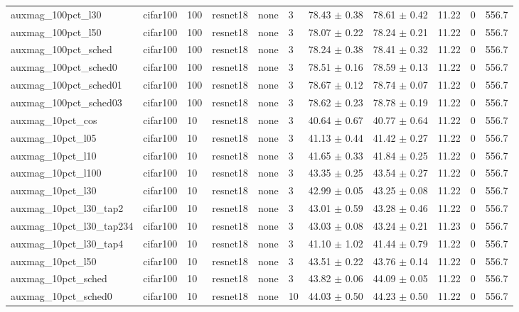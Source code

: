 \begin{tabular}{lllllllllll}
auxmag_100pct_l30 & cifar100 & 100 & resnet18 & none & 3 & 78.43 $\pm$ 0.38 & 78.61 $\pm$ 0.42 & 11.22 & 0 & 556.7 \\
auxmag_100pct_l50 & cifar100 & 100 & resnet18 & none & 3 & 78.07 $\pm$ 0.22 & 78.24 $\pm$ 0.21 & 11.22 & 0 & 556.7 \\
auxmag_100pct_sched & cifar100 & 100 & resnet18 & none & 3 & 78.24 $\pm$ 0.38 & 78.41 $\pm$ 0.32 & 11.22 & 0 & 556.7 \\
auxmag_100pct_sched0 & cifar100 & 100 & resnet18 & none & 3 & 78.51 $\pm$ 0.16 & 78.59 $\pm$ 0.13 & 11.22 & 0 & 556.7 \\
auxmag_100pct_sched01 & cifar100 & 100 & resnet18 & none & 3 & 78.67 $\pm$ 0.12 & 78.74 $\pm$ 0.07 & 11.22 & 0 & 556.7 \\
auxmag_100pct_sched03 & cifar100 & 100 & resnet18 & none & 3 & 78.62 $\pm$ 0.23 & 78.78 $\pm$ 0.19 & 11.22 & 0 & 556.7 \\
auxmag_10pct_cos & cifar100 & 10 & resnet18 & none & 3 & 40.64 $\pm$ 0.67 & 40.77 $\pm$ 0.64 & 11.22 & 0 & 556.7 \\
auxmag_10pct_l05 & cifar100 & 10 & resnet18 & none & 3 & 41.13 $\pm$ 0.44 & 41.42 $\pm$ 0.27 & 11.22 & 0 & 556.7 \\
auxmag_10pct_l10 & cifar100 & 10 & resnet18 & none & 3 & 41.65 $\pm$ 0.33 & 41.84 $\pm$ 0.25 & 11.22 & 0 & 556.7 \\
auxmag_10pct_l100 & cifar100 & 10 & resnet18 & none & 3 & 43.35 $\pm$ 0.25 & 43.54 $\pm$ 0.27 & 11.22 & 0 & 556.7 \\
auxmag_10pct_l30 & cifar100 & 10 & resnet18 & none & 3 & 42.99 $\pm$ 0.05 & 43.25 $\pm$ 0.08 & 11.22 & 0 & 556.7 \\
auxmag_10pct_l30_tap2 & cifar100 & 10 & resnet18 & none & 3 & 43.01 $\pm$ 0.59 & 43.28 $\pm$ 0.46 & 11.22 & 0 & 556.7 \\
auxmag_10pct_l30_tap234 & cifar100 & 10 & resnet18 & none & 3 & 43.03 $\pm$ 0.08 & 43.24 $\pm$ 0.21 & 11.23 & 0 & 556.7 \\
auxmag_10pct_l30_tap4 & cifar100 & 10 & resnet18 & none & 3 & 41.10 $\pm$ 1.02 & 41.44 $\pm$ 0.79 & 11.22 & 0 & 556.7 \\
auxmag_10pct_l50 & cifar100 & 10 & resnet18 & none & 3 & 43.51 $\pm$ 0.22 & 43.76 $\pm$ 0.14 & 11.22 & 0 & 556.7 \\
auxmag_10pct_sched & cifar100 & 10 & resnet18 & none & 3 & 43.82 $\pm$ 0.06 & 44.09 $\pm$ 0.05 & 11.22 & 0 & 556.7 \\
auxmag_10pct_sched0 & cifar100 & 10 & resnet18 & none & 10 & 44.03 $\pm$ 0.50 & 44.23 $\pm$ 0.50 & 11.22 & 0 & 556.7 \\

\end{tabular}
